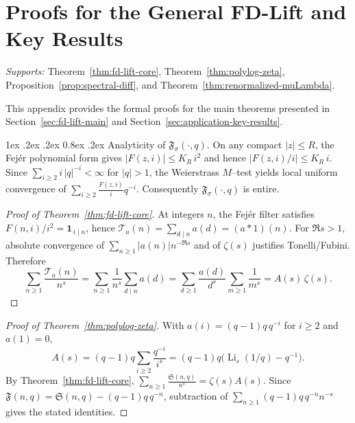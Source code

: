 \documentclass[11pt,a4paper]{amsart}
\makeatletter
\renewcommand\paragraph{\@startsection{paragraph}{4}{\z@}%
  {1ex \@plus .2ex \@minus .2ex}%
  {0.8ex \@plus .2ex}%
  {\normalfont\bfseries}}
\theoremstyle{plain}
\theoremstyle{definition}
\theoremstyle{remark}
\makeatother
\begin{document}
\section{Proofs for the General FD-Lift and Key Results}\label{app:fdlift-proofs}
\noindent\textit{Supports:} Theorem~\ref{thm:fd-lift-core}, Theorem~\ref{thm:polylog-zeta}, Proposition~\ref{prop:spectral-diff}, and Theorem~\ref{thm:renormalized-muLambda}.

This appendix provides the formal proofs for the main theorems presented in Section~\ref{sec:fd-lift-main} and Section~\ref{sec:application-key-results}.

\paragraph{Analyticity of $\mathfrak{F}_\sigma(\cdot,q)$.}
On any compact $|z|\le R$, the Fejér polynomial form gives $|F(z,i)|\le K_R\,i^2$ and hence $|F(z,i)/i|\le K_R\,i$. Since $\sum_{i\ge2} i\,|q|^{-i}<\infty$ for $|q|>1$, the Weierstrass $M$–test yields local uniform convergence of $\sum_{i\ge2} \frac{F(z,i)}{i}q^{-i}$. Consequently $\mathfrak{F}_\sigma(\cdot,q)$ is entire.

\begin{proof}[Proof of Theorem~\ref{thm:fd-lift-core}]
At integers $n$, the Fej\'er filter satisfies $F(n,i)/i^2=\mathbf 1_{\,i\mid n}$, hence $\mathcal T_a(n)=\sum_{d\mid n}a(d)=(a*1)(n)$. For $\Re s>1$, absolute convergence of $\sum_{n\ge1} |a(n)|n^{-\Re s}$ and of $\zeta(s)$ justifies Tonelli/Fubini. Therefore
\[
\sum_{n\ge1}\frac{\mathcal T_a(n)}{n^s}
=\sum_{n\ge1}\frac{1}{n^s}\sum_{d\mid n}a(d)
=\sum_{d\ge1}\frac{a(d)}{d^s}\sum_{m\ge1}\frac{1}{m^s}
=A(s)\,\zeta(s).
\]
\end{proof}

\begin{proof}[Proof of Theorem~\ref{thm:polylog-zeta}]
With $a(i)=(q-1)q\,q^{-i}$ for $i\ge2$ and $a(1)=0$,
\[
A(s)=(q-1)q\sum_{i\ge2}\frac{q^{-i}}{i^s}=(q-1)q\bigl(\operatorname{Li}_s(1/q)-q^{-1}\bigr).
\]
By Theorem~\ref{thm:fd-lift-core},
\(
\sum_{n\ge1}\frac{\mathfrak S(n,q)}{n^s}=\zeta(s)A(s).
\)
Since $\mathfrak F(n,q)=\mathfrak S(n,q)-(q-1)q\,q^{-n}$, subtraction of $\sum_{n\ge1}(q-1)q\,q^{-n}n^{-s}$ gives the stated identities.
\end{proof}
\end{document}
